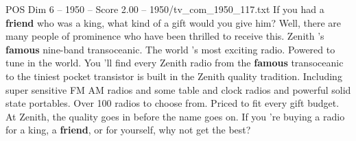 \begin{textsample}{POS Dim 6 – 1950 – Score 2.00 – 1950/tv\_com\_1950\_117.txt}  \label{ex:f6_pos_012}
If you had a \textbf{friend} who was a king, what kind of a gift would you give him?
Well, there are many people of prominence who have been thrilled to receive this.
Zenith 's \textbf{famous} nine-band transoceanic.
The world 's most exciting radio.
Powered to tune in the world.
You 'll find every Zenith radio from the \textbf{famous} transoceanic to the tiniest pocket transistor is built in the Zenith quality tradition.
Including super sensitive FM AM radios and some table and clock radios and powerful solid state portables.
Over 100 radios to choose from.
Priced to fit every gift budget.
At Zenith, the quality goes in before the name goes on.
If you 're buying a radio for a king, a \textbf{friend}, or for yourself, why not get the best?

\end{textsample}
